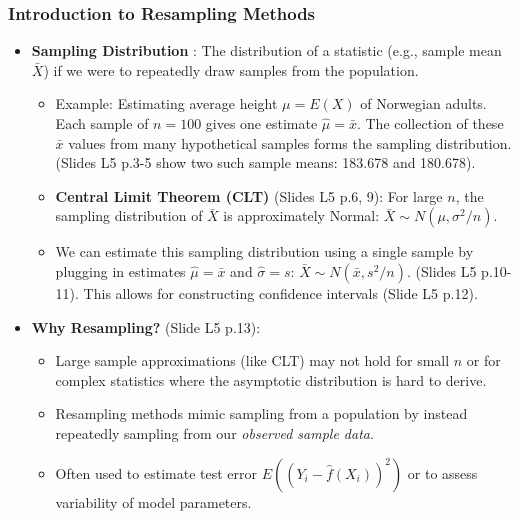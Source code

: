 \documentclass[12pt,a4paper]{article}
\begin{document}
\begin{itemize}
    \subsubsection{Introduction to Resampling Methods }
        \begin{itemize}
            \item \textbf{Sampling Distribution} : The distribution of a statistic (e.g., sample mean $\bar{X}$) if we were to repeatedly draw samples from the population.
                \begin{itemize}
                    \item Example: Estimating average height $\mu=E(X)$ of Norwegian adults. Each sample of $n=100$ gives one estimate $\hat{\mu} = \bar{x}$. The collection of these $\bar{x}$ values from many hypothetical samples forms the sampling distribution. (Slides L5 p.3-5 show two such sample means: 183.678 and 180.678).
                    \item \textbf{Central Limit Theorem (CLT)} (Slides L5 p.6, 9): For large $n$, the sampling distribution of $\bar{X}$ is approximately Normal: $\bar{X} \sim N(\mu, \sigma^2/n)$.
                    \item We can estimate this sampling distribution using a single sample by plugging in estimates $\hat{\mu}=\bar{x}$ and $\hat{\sigma}=s$: $\bar{X} \sim N(\bar{x}, s^2/n)$. (Slides L5 p.10-11). This allows for constructing confidence intervals (Slide L5 p.12).
                \end{itemize}
            \item \textbf{Why Resampling?} (Slide L5 p.13):
                \begin{itemize}
                    \item Large sample approximations (like CLT) may not hold for small $n$ or for complex statistics where the asymptotic distribution is hard to derive.
                    \item Resampling methods mimic sampling from a population by instead repeatedly sampling from our \textit{observed sample data}.
                    \item Often used to estimate test error $E((Y_i - \hat{f}(X_i))^2)$ or to assess variability of model parameters.
                \end{itemize}
        \end{itemize}


\end{itemize}
\end{document}
